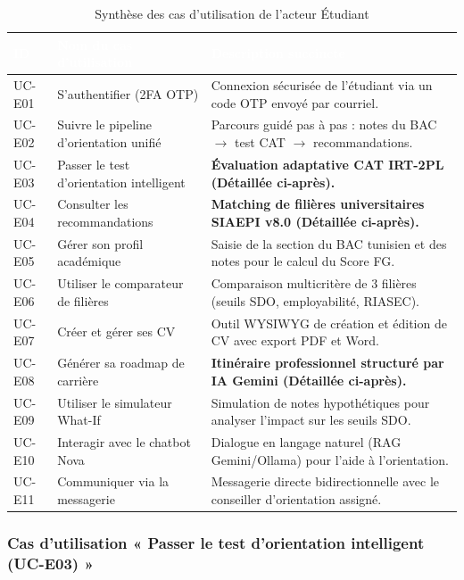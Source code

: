 \begin{table}[H]
\centering
\small
\begin{tabular}{|l|p{4cm}|p{8.5cm}|}
\hline
\rowcolor{headercolor}\textcolor{white}{\textbf{ID}} & \textcolor{white}{\textbf{Nom du cas d'utilisation}} & \textcolor{white}{\textbf{Description succincte}} \\
\hline
UC-E01 & S'authentifier (2FA OTP) & Connexion sécurisée de l'étudiant via un code OTP envoyé par courriel. \\
\hline
UC-E02 & Suivre le pipeline d'orientation unifié & Parcours guidé pas à pas : notes du BAC $\rightarrow$ test CAT $\rightarrow$ recommandations. \\
\hline
UC-E03 & Passer le test d'orientation intelligent & \textbf{Évaluation adaptative CAT IRT-2PL (Détaillée ci-après).} \\
\hline
UC-E04 & Consulter les recommandations & \textbf{Matching de filières universitaires SIAEPI v8.0 (Détaillée ci-après).} \\
\hline
UC-E05 & Gérer son profil académique & Saisie de la section du BAC tunisien et des notes pour le calcul du Score FG. \\
\hline
UC-E06 & Utiliser le comparateur de filières & Comparaison multicritère de 3 filières (seuils SDO, employabilité, RIASEC). \\
\hline
UC-E07 & Créer et gérer ses CV & Outil WYSIWYG de création et édition de CV avec export PDF et Word. \\
\hline
UC-E08 & Générer sa roadmap de carrière & \textbf{Itinéraire professionnel structuré par IA Gemini (Détaillée ci-après).} \\
\hline
UC-E09 & Utiliser le simulateur What-If & Simulation de notes hypothétiques pour analyser l'impact sur les seuils SDO. \\
\hline
UC-E10 & Interagir avec le chatbot Nova & Dialogue en langage naturel (RAG Gemini/Ollama) pour l'aide à l'orientation. \\
\hline
UC-E11 & Communiquer via la messagerie & Messagerie directe bidirectionnelle avec le conseiller d'orientation assigné. \\
\hline
\end{tabular}
\caption{Synthèse des cas d'utilisation de l'acteur Étudiant}
\label{tab:synthese_uc_etudiant}
\end{table}

\vspace{1em}

\subsubsection*{Cas d'utilisation « Passer le test d'orientation intelligent (UC-E03) »}

